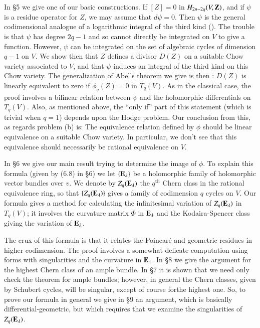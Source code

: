 In \S5 we give one of our basic constructions. If $[Z]=0$ in $H_{2n-2q}(V,\mathbf{Z})$, and if $\psi$ is a residue operator for $Z$, we may assume that $d\psi=0$. Then $\psi$ is the general codimensional analogue of a logarithmic integral of the third kind (\cite{art08-key17}). The trouble is that $\psi$ has degree $2q-1$ and so cannot directly be integrated on $V$ to give a function. However, $\psi$ can be integrated on the set of algebraic cycles of dimension $q-1$ on $V$. We show then that $Z$ defines a divisor $D(Z)$ on a suitable Chow variety associated to $V$, and that $\psi$ induces an integral of the third kind on this Chow variety. The generalization of Abel's theorem we give is then : $D(Z)$ is linearly equivalent to zero if $\phi_{q}(Z)=0$ in $T_{q}(V)$. As in the classical case, the proof involves a bilinear relation between $\psi$ and the holomorphic differentials on $T_{q}(V)$. Also, as mentioned above, the ``only if'' part of this statement (which is trivial when $q=1$) depends upon the Hodge problem. Our conclusion from this, as regards problem (b) is: The equivalence relation defined by $\phi$ should be linear equivalence on a suitable Chow variety. In particular, we don't see that this equivalence should necessarily be rational equivalence on $V$.

In \S6 we give our main result trying to determine the image of $\phi$. To explain this formula (given by (6.8) in \S6) we let $\{\mathbf{E}_{\lambda}\}$ be a holomorphic family of holomorphic vector bundles over $v$. We denote by $Z_{q}(\mathbf{E}_{\lambda})$ the $q^{\text{th}}$ Chern class in the rational equivalence ring, so that $\{Z_{q}(\mathbf{E}_{\lambda})\}$ gives a family of codimension $q$ cycles on $V$. Our formula gives a method for calculating the infinitesimal variation of $Z_{q}(\mathbf{E}_{\lambda})$ in $T_{q}(V)$; it involves the curvature matrix $\Phi$ in $\mathbf{E}_{\lambda}$ and the Kodaira-Spencer class giving the variation of $\mathbf{E}_{\lambda}$.

The crux of this formula is that it relates the Poincar\'e and geometric residues in higher codimension. The proof involves a somewhat delicate computation using forms with singularities and the curvature in $\mathbf{E}_{\lambda}$. In \S8 we give the argument for the highest Chern class of an ample bundle. In \S7 it is shown that we need only check the theorem for ample bundles; however, in general the Chern classes, given by Schubert cycles, will be singular, except of course for\pageoriginale the highest one. So, to prove our formula in general we give in \S9 an argument, which is basically differential-geometric, but which requires that we examine the singularities of $Z_{q}(\mathbf{E}_{\lambda})$.

